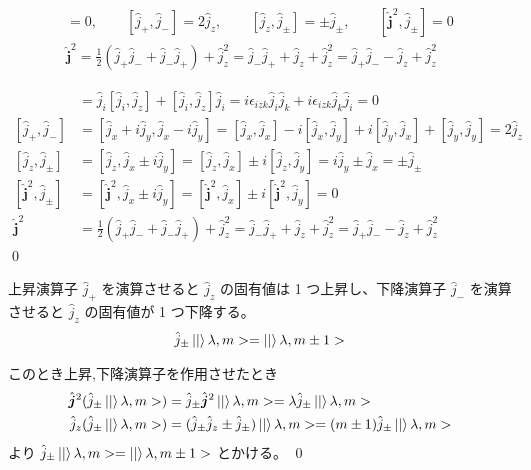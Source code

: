 \documentclass[uplatex,dvipdfmx,a4paper,11pt]{jlreq}
\makeatletter
\numberwithin{equation}{section}
\theoremstyle{definition}
\renewenvironment{proof}[1][\proofname]{\par
  \normalfont
  \topsep6\p@\@plus6\p@ \trivlist
  \item[\hskip\labelsep{\bfseries #1}\@addpunct{\bfseries}]\ignorespaces\quad\par
}{%
  \qed\endtrivlist\@endpefalse
}
\renewcommand\proofname{証明}
\makeatother
\begin{document}
\begin{proposition}
  \begin{align}
    [\hat{\bm{j}}^2, \hat{j}_z] = 0, \qquad [\hat{j}_+, \hat{j}_-] = 2\hat{j}_z, \qquad [\hat{j}_z, \hat{j}_\pm] = \pm \hat{j}_\pm, \qquad [\hat{\bm{j}}^2, \hat{j}_\pm] = 0 \\
    \hat{\bm{j}}^2 = \frac{1}{2}(\hat{j}_+\hat{j}_- + \hat{j}_-\hat{j}_+) + \hat{j}_z^2 = \hat{j}_-\hat{j}_+ + \hat{j}_z + \hat{j}_z^2 = \hat{j}_+\hat{j}_- - \hat{j}_z + \hat{j}_z^2
  \end{align}
\end{proposition}
\begin{proof}
  \begin{align}
    [\hat{\bm{j}}^2, \hat{j}_z]   & = \hat{j}_i[\hat{j}_i, \hat{j}_z] + [\hat{j}_i, \hat{j}_z]\hat{j}_i = i\epsilon_{izk}\hat{j}_i\hat{j}_k + i\epsilon_{izk}\hat{j}_k\hat{j}_i = 0                       \\
    [\hat{j}_+, \hat{j}_-]        & = [\hat{j}_x + i\hat{j}_y, \hat{j}_x - i\hat{j}_y] = [\hat{j}_x, \hat{j}_x] - i[\hat{j}_x, \hat{j}_y] + i[\hat{j}_y, \hat{j}_x] + [\hat{j}_y, \hat{j}_y] = 2\hat{j}_z \\
    [\hat{j}_z, \hat{j}_\pm]      & = [\hat{j}_z, \hat{j}_x \pm i\hat{j}_y] = [\hat{j}_z, \hat{j}_x] \pm i[\hat{j}_z, \hat{j}_y] = i\hat{j}_y \pm \hat{j}_x = \pm \hat{j}_\pm                             \\
    [\hat{\bm{j}}^2, \hat{j}_\pm] & = [\hat{\bm{j}}^2, \hat{j}_x \pm i\hat{j}_y] = [\hat{\bm{j}}^2, \hat{j}_x] \pm i[\hat{\bm{j}}^2, \hat{j}_y] = 0                                                       \\
    \hat{\bm{j}}^2                & = \frac{1}{2}(\hat{j}_+\hat{j}_- + \hat{j}_-\hat{j}_+) + \hat{j}_z^2 = \hat{j}_-\hat{j}_+ + \hat{j}_z + \hat{j}_z^2 = \hat{j}_+\hat{j}_- - \hat{j}_z + \hat{j}_z^2
  \end{align}
\end{proof}

\begin{proposition}
  上昇演算子 $\hat{j}_+$ を演算させると $\hat{j}_z$ の固有値は 1 つ上昇し、下降演算子 $\hat{j}_-$ を演算させると $\hat{j}_z$ の固有値が 1 つ下降する。
  \begin{align}
    \hat{j}_\pm\ket|\lambda, m> = \ket|\lambda, m\pm 1>
  \end{align}
\end{proposition}
\begin{proof}
  このとき上昇,下降演算子を作用させたとき
  \begin{align}
    \hat{\bm{j}}^2(\hat{j}_\pm\ket|\lambda, m>) & = \hat{j}_\pm\hat{\bm{j}}^2\ket|\lambda, m> = \lambda \hat{j}_\pm\ket|\lambda, m>               \\
    \hat{j}_z(\hat{j}_\pm\ket|\lambda, m>)      & = (\hat{j}_\pm \hat{j}_z \pm \hat{j}_\pm)\ket|\lambda, m> = (m\pm 1)\hat{j}_\pm\ket|\lambda, m>
  \end{align}
  より $\hat{j}_\pm\ket|\lambda, m> = \ket|\lambda, m\pm 1>$ とかける。
\end{proof}
\end{document}

